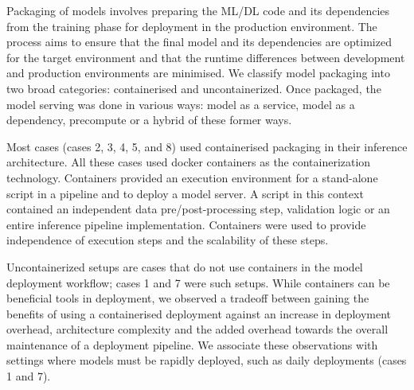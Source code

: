 
Packaging of models involves preparing the ML/DL code and its dependencies from the training phase for deployment in the production environment. The process aims to ensure that the final model and its dependencies are optimized for the target environment and that the runtime differences between development and production environments are minimised. We classify model packaging into two broad categories: containerised and uncontainerized. Once packaged, the model serving was done in various ways: model as a service, model as a dependency, precompute or a hybrid of these former ways. 

Most cases (cases 2, 3, 4, 5, and 8) used containerised packaging in their inference architecture. All these cases used docker containers as the containerization technology. Containers provided an execution environment for a stand-alone script in a pipeline and to deploy a model server. A script in this context contained an independent data pre/post-processing step, validation logic or an entire inference pipeline implementation. Containers were used to provide independence of execution steps and the scalability of these steps.

Uncontainerized setups are cases that do not use containers in the model deployment workflow; cases 1 and 7 were such setups. While containers can be beneficial tools in deployment, we observed a tradeoff between gaining the benefits of using a containerised deployment against an increase in deployment overhead, architecture complexity and the added overhead towards the overall maintenance of a deployment pipeline. We associate these observations with settings where models must be rapidly deployed, such as daily deployments (cases 1 and 7). %

